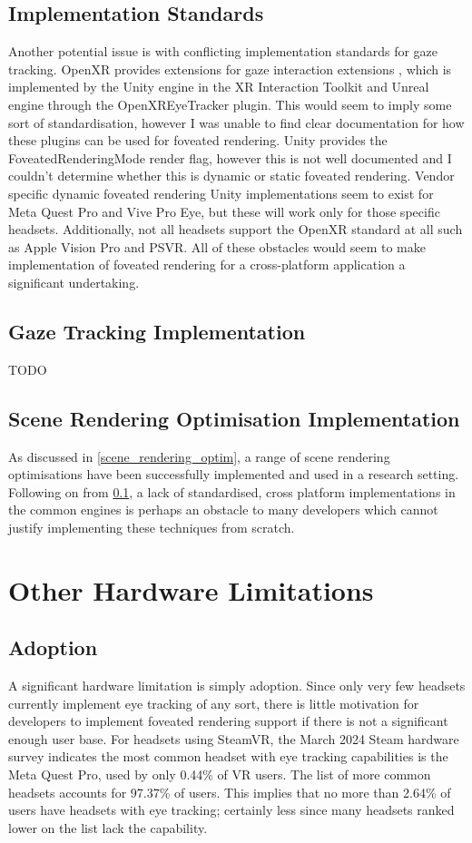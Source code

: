 \documentclass[a4paper,11pt]{article}
\begin{document}
\subsection{Implementation Standards}
\label{standards}
Another potential issue is with conflicting implementation standards for gaze tracking. OpenXR provides extensions for gaze interaction extensions \cite{xr_gaze}, which is implemented by the Unity engine in the XR Interaction Toolkit \cite{xr_gaze_unity} and Unreal engine through the OpenXREyeTracker plugin\cite{xr_gaze_unreal}. This would seem to imply some sort of standardisation, however I was unable to find clear documentation for how these plugins can be used for foveated rendering. Unity provides the FoveatedRenderingMode render flag\cite{unity_fove}, however this is not well documented and I couldn't determine whether this is dynamic or static foveated rendering. Vendor specific dynamic foveated rendering Unity implementations seem to exist for Meta Quest Pro\cite{meta_unity} and Vive Pro Eye\cite{vive_unity}, but these will work only for those specific headsets. Additionally, not all headsets support the OpenXR standard at all such as Apple Vision Pro and PSVR\cite{openxr_conform}. All of these obstacles would seem to make implementation of foveated rendering for a cross-platform application a significant undertaking.

\subsection{Gaze Tracking Implementation}
TODO

\subsection{Scene Rendering Optimisation Implementation}
As discussed in \cref{scene_rendering_optim}, a range of scene rendering optimisations have been successfully implemented and used in a research setting. Following on from \cref{standards}, a lack of standardised, cross platform implementations in the common engines is perhaps an obstacle to many developers which cannot justify implementing these techniques from scratch.

\section{Other Hardware Limitations}
\subsection{Adoption}
A significant hardware limitation is simply adoption. Since only very few headsets currently implement eye tracking of any sort, there is little motivation for developers to implement foveated rendering support if there is not a significant enough user base. For headsets using SteamVR, the March 2024 Steam hardware survey indicates the most common headset with eye tracking capabilities is the Meta Quest Pro, used by only 0.44\% of VR users. The list of more common headsets accounts for 97.37\% of users. This implies that no more than 2.64\% of users have headsets with eye tracking; certainly less since many headsets ranked lower on the list lack the capability.
\end{document}
